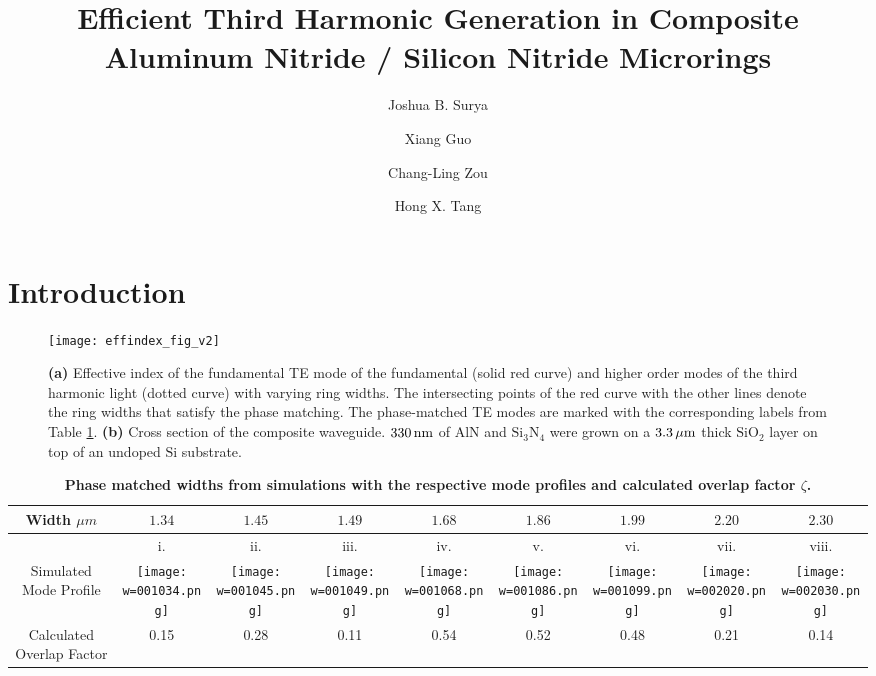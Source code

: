 \documentclass[9pt,twocolumn,twoside]{optica}
\title{Efficient Third Harmonic Generation in Composite Aluminum Nitride / Silicon Nitride Microrings}
\author[1]{Joshua B. Surya}
\author[1]{Xiang Guo}
\author[1]{Chang-Ling Zou}
\author[1,*]{Hong X. Tang}
\affil[1]{Department of Electrical Engineering, Yale University, New Haven, Connecticut 06511, USA}
\affil[*]{Corresponding author: hong.tang@yale.edu}
\begin{document}
\maketitle
\thispagestyle{fancy}

\section{Introduction}




\begin{figure*}[ht]
\centering
\texttt{[image: effindex\_fig\_v2]}
\caption{\textbf{(a)} Effective index of the fundamental TE mode of the fundamental (solid red curve) and higher order modes of the third harmonic light (dotted curve) with varying ring widths. The intersecting points of the red curve with the other lines denote the ring widths that satisfy the phase matching. The phase-matched TE modes are marked with the corresponding labels from Table \ref{tab:modeprofile}. \textbf{(b)} Cross section of the composite waveguide. $\mathrm{330\thinspace nm}$ of AlN and $\mathrm{Si_{3}N_{4}}$ were grown on a $3.3\thinspace\mu \mathrm{m}$ thick $\mathrm{SiO_{2}}$ layer on top of an undoped $\mathrm{Si}$ substrate.}
\label{fig:effindex}
\end{figure*}
%
\begin{table*}[ht]
\centering
\caption{\bf Phase matched widths from simulations with the respective mode profiles and calculated overlap factor $\zeta$. }
\begin{tabular}{ccccccccc}
\hline
Width $\mu m$ & $1.34$ & $1.45$ & $1.49$ & $1.68$ & $1.86$ & $1.99$ & $2.20$ & $2.30$\\
\hline
\hfill & i. & ii. & iii. & iv. & v. & vi. & vii. & viii.\\
Simulated Mode Profile & \texttt{[image: w=001034.png]} & \texttt{[image: w=001045.png]} & \texttt{[image: w=001049.png]} & \texttt{[image: w=001068.png]} & \texttt{[image: w=001086.png]} & \texttt{[image: w=001099.png]} & \texttt{[image: w=002020.png]} & \texttt{[image: w=002030.png]}\\
Calculated Overlap Factor & 0.15 & 0.28 & 0.11 & 0.54 & 0.52 & 0.48 & 0.21 & 0.14\\
\hline
\end{tabular}
  \label{tab:modeprofile}
\end{table*}
%
\end{document}
